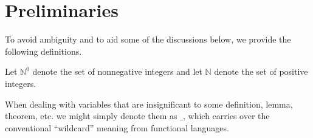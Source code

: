 \section{Preliminaries}

To avoid ambiguity and to aid some of the discussions below, we provide the
following definitions.

\begin{definition} Let $\mathbb{N}^0$ denote the set of nonnegative integers
and let $\mathbb{N}$ denote the set of positive integers.\end{definition}

\begin{definition} When dealing with variables that are insignificant to some
definition, lemma, theorem, etc. we might simply denote them as $\_$, which
carries over the conventional ``wildcard'' meaning from functional
languages.\end{definition}

